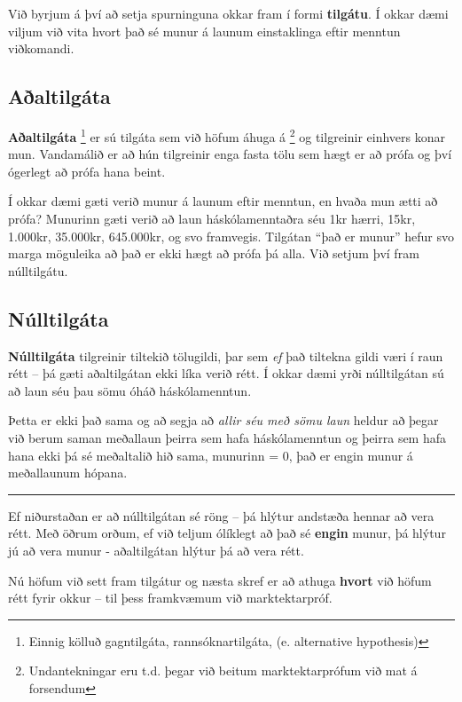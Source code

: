 \documentclass[
]{book}
\begin{document}
Við byrjum á því að setja spurninguna okkar fram í formi \textbf{tilgátu}. Í
okkar dæmi viljum við vita hvort það sé munur á launum einstaklinga
eftir menntun viðkomandi.

\hypertarget{auxf0altilguxe1ta}{%
\subsection{Aðaltilgáta}\label{auxf0altilguxe1ta}}

\textbf{Aðaltilgáta} \footnote{Einnig kölluð gagntilgáta, rannsóknartilgáta, (e.
  alternative hypothesis)} er sú tilgáta sem við höfum áhuga
á \footnote{Undantekningar eru t.d. þegar við beitum
  marktektarprófum við mat á forsendum} og tilgreinir einhvers konar mun. Vandamálið er
að hún tilgreinir enga fasta tölu sem hægt er að prófa og því ógerlegt
að prófa hana beint.

Í okkar dæmi gæti verið munur á launum eftir menntun, en hvaða mun ætti
að prófa? Munurinn gæti verið að laun háskólamenntaðra séu 1kr hærri,
15kr, 1.000kr, 35.000kr, 645.000kr, og svo framvegis. Tilgátan ``það er
munur'' hefur svo marga möguleika að það er ekki hægt að prófa þá alla.
Við setjum því fram núlltilgátu.

\hypertarget{nuxfalltilguxe1ta}{%
\subsection{Núlltilgáta}\label{nuxfalltilguxe1ta}}

\textbf{Núlltilgáta} tilgreinir tiltekið tölugildi, þar sem \emph{ef} það tiltekna
gildi væri í raun rétt -- þá gæti aðaltilgátan ekki líka verið rétt. Í
okkar dæmi yrði núlltilgátan sú að laun séu þau sömu óháð
háskólamenntun.

Þetta er ekki það sama og að segja að \emph{allir séu með sömu laun} heldur
að þegar við berum saman meðallaun þeirra sem hafa háskólamenntun og
þeirra sem hafa hana ekki þá sé meðaltalið hið sama, munurinn = 0, það
er engin munur á meðallaunum hópana.

\begin{center}\rule{0.5\linewidth}{0.5pt}\end{center}

Ef niðurstaðan er að núlltilgátan sé röng -- þá hlýtur andstæða hennar
að vera rétt. Með öðrum orðum, ef við teljum ólíklegt að það sé
\textbf{engin} munur, þá hlýtur jú að vera munur - aðaltilgátan hlýtur þá að
vera rétt.

Nú höfum við sett fram tilgátur og næsta skref er að athuga \textbf{hvort}
við höfum rétt fyrir okkur -- til þess framkvæmum við marktektarpróf.
\end{document}
